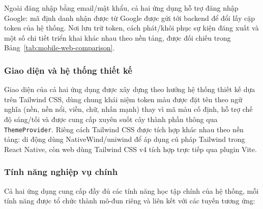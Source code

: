 Ngoài đăng nhập bằng email/mật khẩu, cả hai ứng dụng hỗ trợ đăng nhập Google: mã định danh nhận được từ Google được gửi tới backend để đổi lấy cặp token của hệ thống. Nơi lưu trữ token, cách phát/khôi phục sự kiện đăng xuất và một số chi tiết triển khai khác nhau theo nền tảng, được đối chiếu trong Bảng~\ref{tab:mobile-web-comparison}.

\subsubsection{Giao diện và hệ thống thiết kế}
\label{subsubsec:frontend-ui}

Giao diện của cả hai ứng dụng được xây dựng theo hướng hệ thống thiết kế dựa trên Tailwind CSS, dùng chung khái niệm token màu được đặt tên theo ngữ nghĩa (nền, nền nổi, viền, chữ, nhấn mạnh) thay vì mã màu cố định, hỗ trợ chế độ sáng/tối và được cung cấp xuyên suốt cây thành phần thông qua \texttt{ThemeProvider}. Riêng cách Tailwind CSS được tích hợp khác nhau theo nền tảng: di động dùng NativeWind/uniwind để áp dụng cú pháp Tailwind trong React Native, còn web dùng Tailwind CSS v4 tích hợp trực tiếp qua plugin Vite.

\subsubsection{Tính năng nghiệp vụ chính}
\label{subsubsec:frontend-features}

Cả hai ứng dụng cung cấp đầy đủ các tính năng học tập chính của hệ thống, mỗi tính năng được tổ chức thành mô-đun riêng và liên kết với các tuyến tương ứng:

